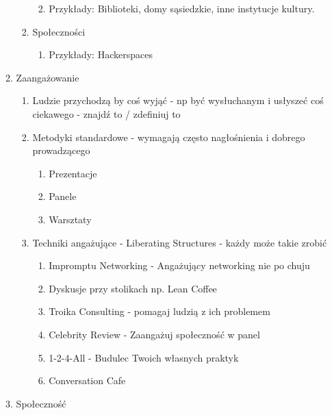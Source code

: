 \begin{enumerate}
\begin{enumerate}
\begin{enumerate}
      \begin{enumerate}
      \def\labelenumiv{\arabic{enumiv}.}
      \tightlist
      \item
        Przykłady: Biblioteki, domy sąsiedzkie, inne instytucje kultury.
      \end{enumerate}
    \item
      Społeczności

      \begin{enumerate}
      \def\labelenumiv{\arabic{enumiv}.}
      \tightlist
      \item
        Przykłady: Hackerspaces
      \end{enumerate}
    \end{enumerate}
  \item
    Zaangażowanie

    \begin{enumerate}
    \def\labelenumiii{\arabic{enumiii}.}
    \tightlist
    \item
      Ludzie przychodzą by coś wyjąć - np być wysłuchanym i usłyszeć coś
      ciekawego - znajdź to / zdefiniuj to
    \item
      Metodyki standardowe - wymagają często nagłośnienia i dobrego
      prowadzącego

      \begin{enumerate}
      \def\labelenumiv{\arabic{enumiv}.}
      \tightlist
      \item
        Prezentacje
      \item
        Panele
      \item
        Warsztaty
      \end{enumerate}
    \item
      Techniki angażujące - Liberating Structures - każdy może takie
      zrobić

      \begin{enumerate}
      \def\labelenumiv{\arabic{enumiv}.}
      \tightlist
      \item
        Impromptu Networking - Angażujący networking nie po chuju
      \item
        Dyskusje przy stolikach np. Lean Coffee
      \item
        Troika Consulting - pomagaj ludzią z ich problemem
      \item
        Celebrity Review - Zaangażuj społeczność w panel
      \item
        1-2-4-All - Budulec Twoich własnych praktyk
      \item
        Conversation Cafe
      \end{enumerate}
    \end{enumerate}
  \item
    Społeczność


\end{enumerate}
\end{enumerate}

